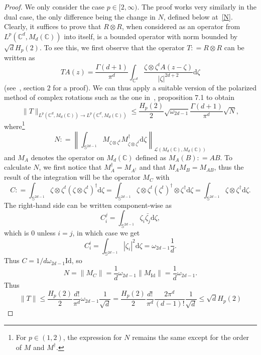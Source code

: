 \documentclass[11pt, a4paper]{amsart}
\theoremstyle{definition}
\theoremstyle{remark}
\newcommand{\C}{\mathbb{C}}
\begin{document}
\begin{proof}
We only consider the case $p\in [2,\infty)$.
The proof works very similarly in the dual case,
the only difference being the change in $N$,
defined below at~\eqref{N}.
Clearly, it suffices to prove that $R\otimes R $, 
when considered as an operator from $L^p(\C^d, M_d(\C))$
into itself,
is a bounded operator with norm bounded
by $\sqrt d H_p(2)$.
To see this, we first observe that
the operator $T\mathrel{:}=R\otimes R$ can
be written as
\begin{equation*}
T A(z)=
\frac{\Gamma(d+1)}{\pi^d}\int_{\C^d}
\frac{\zeta\otimes \zeta^t A(z-\zeta)}{|\zeta|^{2d+2}}
\text{d} \zeta
\end{equation*}
(see~\cite{IM}, section $2$ for a proof).
We can thus apply a suitable version of the
polarized method of complex rotations
such as the one in~\cite{IM}, proposition 7.1 to obtain
\begin{equation*}
\|T\|_{L^p(\C^d, M_d(\C))\to L^p(\C^d, M_d(\C))}
\le \frac{H_p(2)}{2}
\sqrt{\omega_{2d-1}}\frac{\Gamma(d+1)}{\pi^d}\sqrt N,
\end{equation*}
where\footnote{For $p\in (1,2)$,
the expression for $N$ remains
the same except for the order of
$M$ and $M^\dagger$.}
\begin{equation}\label{N}
N\mathrel{:}=
\left\|
\int_{\mathbb S^{2d-1}} M_{\zeta\otimes \zeta^t}
M_{\zeta\otimes \zeta^t}^\dagger\text{d}\zeta
\right\|_{\mathcal L(M_d(\C), M_d(\C))}
\end{equation}
and $M_A$ denotes the operator on $M_d(\C)$
defined as $M_A(B)\mathrel{:}=AB$.
To calculate $N$, we first notice
that $M_A^\dagger=M_{A^\dagger}$
and that $M_AM_B=M_{AB}$,
thus the result of the integration
will be the operator $M_C$ with 
\begin{equation*}
C\mathrel{:}=
\int_{\mathbb{S}^{2d-1}}\zeta\otimes
\zeta^t(\zeta\otimes \zeta^t)^\dagger
\text{d}\zeta=
\int_{\mathbb{S}^{2d-1}}
\zeta\otimes\zeta^t(\zeta^t)^\dagger\otimes \zeta^\dagger
\text{d}\zeta=\int_{\mathbb{S}^{2d-1}}
\zeta\otimes \zeta^\dagger\text{d}\zeta.
\end{equation*}
The right-hand side can be written component-wise as
\begin{equation*}
C_i^j=\int_{\mathbb{S}^{2d-1}}
\zeta_i\bar{\zeta_j}\text{d}\zeta,
\end{equation*}
which is $0$ unless $i=j$, in which case we get
\begin{equation*}
C_i^i=\int_{\mathbb{S}^{2d-1}}
|\zeta_i|^2\text{d}\zeta
=\omega_{2d-1}\frac{1}{d}.
\end{equation*}
Thus $C=1/d\omega_{2d-1}\mathrm{Id}$, so 
\begin{equation*}
N=\|M_C\|=\frac{1}{d}\omega_{2d-1}\|M_{\mathrm{Id}}\|=
\frac{1}{d}\omega_{2d-1}.
\end{equation*}
Thus
\begin{equation*}
\|T\|\le \frac{H_p(2)}2\frac{d!}{\pi ^d}\omega_{2d-1}
\frac{1}{\sqrt{d}}=\frac{H_p(2)}2
\frac{d!}{\pi^d}\frac{2\pi^d}{(d-1)!}\frac{1}{\sqrt{d}}
\le \sqrt{d}H_p(2)
\end{equation*}
\end{proof}
\end{document}
